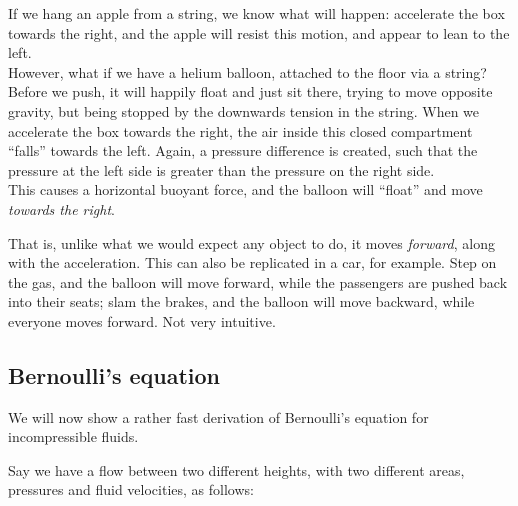 If we hang an apple from a string, we know what will happen: accelerate the box towards the right, and the apple will resist this motion, and appear to lean to the left.\\
However, what if we have a helium balloon, attached to the floor via a string? Before we push, it will happily float and just sit there, trying to move opposite gravity, but being stopped by the downwards tension in the string. When we accelerate the box towards the right, the air inside this closed compartment ``falls'' towards the left. Again, a pressure difference is created, such that the pressure at the left side is greater than the pressure on the right side.\\
This causes a horizontal buoyant force, and the balloon will ``float'' and move \emph{towards the right}.

That is, unlike what we would expect any object to do, it moves \emph{forward}, along with the acceleration. This can also be replicated in a car, for example. Step on the gas, and the balloon will move forward, while the passengers are pushed back into their seats; slam the brakes, and the balloon will move backward, while everyone moves forward. Not very intuitive.

\subsection{Bernoulli's equation}

We will now show a rather fast derivation of Bernoulli's equation for incompressible fluids.

Say we have a flow between two different heights, with two different areas, pressures and fluid velocities, as follows:

\begin{figure}[H]
\centering
{}%
\label{fig:my_label}
\end{figure}

